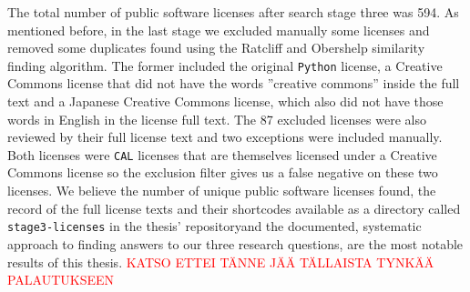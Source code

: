 The total number of public software licenses after search stage three was 594. As mentioned before, in the last stage we excluded manually some licenses and removed some duplicates found using the Ratcliff and Obershelp similarity finding algorithm. The former included the original \texttt{Python} license, a Creative Commons license that did not have the words ''creative commons'' inside the full text and a Japanese Creative Commons license, which also did not have those words in English in the license full text. The 87 excluded licenses were also reviewed by their full license text and two exceptions were included manually. Both licenses were \texttt{CAL} licenses that are themselves licensed under a Creative Commons license so the exclusion filter gives us a false negative on these two licenses. We believe the number of unique public software licenses found, the record of the full license texts and their shortcodes available as a directory called \texttt{stage3-licenses} in the thesis' repository\footnotemark[1] and the documented, systematic approach to finding answers to our three research questions, are the most notable results of this thesis. \textcolor{red}{KATSO ETTEI TÄNNE JÄÄ TÄLLAISTA TYNKÄÄ PALAUTUKSEEN}
